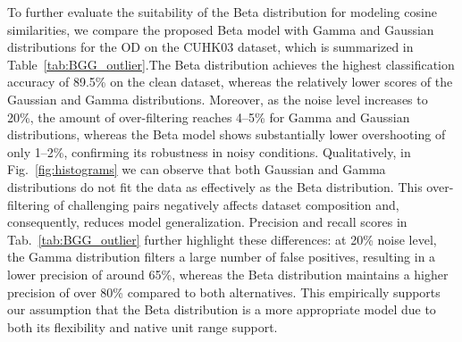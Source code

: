 \documentclass[lettersize,journal]{IEEEtran}
\begin{document}
\vskip 0.15cm
To further evaluate the suitability of the Beta distribution for modeling cosine similarities, we compare the proposed Beta model with Gamma and Gaussian distributions for the OD on the CUHK03 dataset, which is summarized in Table~\ref{tab:BGG_outlier}.The Beta distribution achieves the highest classification accuracy of 89.5\% on the clean dataset, whereas the relatively lower scores of the Gaussian and Gamma distributions.  Moreover, as the noise level increases to 20\%, the amount of over-filtering reaches 4–5\% for Gamma and Gaussian distributions, whereas the Beta model shows substantially lower overshooting of only 1–2\%, confirming its robustness in noisy conditions. Qualitatively, in Fig.~\ref{fig:histograms} we can observe that both Gaussian and Gamma distributions do not fit the data as effectively as the Beta distribution. This over-filtering of challenging pairs negatively affects dataset composition and, consequently, reduces model generalization. Precision and recall scores in Tab.~\ref{tab:BGG_outlier} further highlight these differences: at 20\% noise level, the Gamma distribution filters a large number of false positives, resulting in a lower precision of around 65\%, whereas the Beta distribution maintains a higher precision of over 80\% compared to both alternatives. This empirically supports our assumption that the Beta distribution is a more appropriate model due to both its flexibility and native unit range support.
\end{document}
